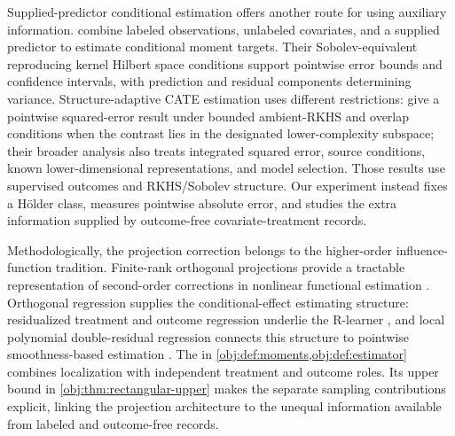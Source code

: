 Supplied-predictor conditional estimation offers another route for using auxiliary information. \citet[Sections 2.4 and 3 and Theorems 1--3]{SuiZhouZhouDai2026} combine labeled observations, unlabeled covariates, and a supplied predictor to estimate conditional moment targets. Their Sobolev-equivalent reproducing kernel Hilbert space conditions support pointwise error bounds and confidence intervals, with prediction and residual components determining variance. Structure-adaptive CATE estimation uses different restrictions: \citet[Sections 2.3 and 6, Corollary 4]{Kim2026StructureAdaptiveCATE} give a pointwise squared-error result under bounded ambient-RKHS and overlap conditions when the contrast lies in the designated lower-complexity subspace; their broader analysis also treats integrated squared error, source conditions, known lower-dimensional representations, and model selection. Those results use supervised outcomes and RKHS/Sobolev structure. Our experiment instead fixes a H\"older class, measures pointwise absolute error, and studies the extra information supplied by outcome-free covariate-treatment records.

Methodologically, the projection correction belongs to the higher-order influence-function tradition. Finite-rank orthogonal projections provide a tractable representation of second-order corrections in nonlinear functional estimation \citep[Lemma 3]{Robins2009}. Orthogonal regression supplies the conditional-effect estimating structure: residualized treatment and outcome regression underlie the R-learner \citep[Section 1]{Nie2021}, and local polynomial double-residual regression connects this structure to pointwise smoothness-based estimation \citep[Theorem 3]{Kennedy2023}. The  in \cref{obj:def:moments,obj:def:estimator} combines localization with independent treatment and outcome roles. Its upper bound in \cref{obj:thm:rectangular-upper} makes the separate sampling contributions explicit, linking the projection architecture to the unequal information available from labeled and outcome-free records.

